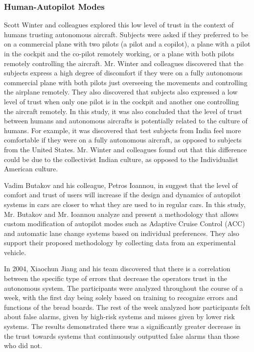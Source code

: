 \documentclass[runningheads,a4paper]{llncs}
\begin{document}
\subsubsection{Human-Autopilot Modes}
Scott Winter and colleagues \cite{winter2015indian} explored this low level of trust in the context of humans trusting autonomous aircraft. Subjects were asked if they preferred to be on a commercial plane with two pilots (a pilot and a copilot), a plane with a pilot in the cockpit and the co-pilot remotely working, or a plane with both pilots remotely controlling the aircraft. Mr. Winter and colleagues discovered that the subjects express a high degree of discomfort if they were on a fully autonomous commercial plane with both pilots just overseeing the movements and controlling the airplane remotely. They also discovered that subjects also expressed a low level of trust when only one pilot is in the cockpit and another one controlling the aircraft remotely. In this study, it was also concluded that the level of trust between humans and autonomous aircrafts is potentially related to the culture of humans. For example, it was discovered that test subjects from India feel more comfortable if they were on a fully autonomous aircraft, as opposed to subjects from the United States. Mr. Winter and colleagues found out that this difference could be due to the collectivist Indian culture, as opposed to the Individualist American culture.

Vadim Butakov and his colleague, Petros Ioannou, in \cite{butakov2015driving} suggest that the level of comfort and trust of users will increase if the design and dynamics of autopilot systems in cars are closer to what they are used to in regular cars. In this study, Mr. Butakov and Mr. Ioannou analyze and present a methodology that allows custom modification of autopilot modes such as  Adaptive Cruise Control (ACC) and automatic lane change systems based on individual preferences. They also support their proposed methodology by collecting data from an experimental vehicle.

In 2004, Xiaochun Jiang and his team discovered that there is a correlation between the specific type of errors that decrease the operators trust in the autonomous system\cite{jiang2004measurement}.  The participants were analyzed throughout the course of a week, with the first day being solely based on training to recognize errors and functions of the bread boards.  The rest of the week analyzed how participants felt about false alarms, given by high-risk systems and misses given by lower risk systems.  The results demonstrated there was a significantly greater decrease in the trust towards systems that continuously outputted false alarms than those who did not.
\end{document}
